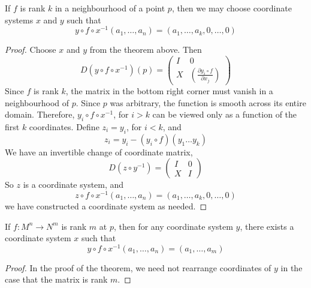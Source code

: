 \begin{corollary}
    If $f$ is rank $k$ in a neighbourhood of a point $p$, then we may choose coordinate systems $x$ and $y$ such that
    \[ y \circ f \circ x^{-1}(a_1, \dots, a_n) = (a_1, \dots, a_k, 0, \dots, 0) \]
\end{corollary}
\begin{proof}
    Choose $x$ and $y$ from the theorem above. Then
    \[ D(y \circ f \circ x^{-1})(p) = \begin{pmatrix} I & 0 \\ X & \left( \frac{\partial y_i \circ f}{\partial x_j} \right) \end{pmatrix} \]
    Since $f$ is rank $k$, the matrix in the bottom right corner must vanish in a neighbourhood of $p$. Since $p$ was arbitrary, the function is smooth across its entire domain. Therefore, $y_i \circ f \circ x^{-1}$, for $i > k$ can be viewed only as a function of the first $k$ coordinates. Define $z_i = y_i$, for $i < k$, and
    \[ z_i = y_i - (y_i \circ f)(y_1 \dots y_k) \]
    We have an invertible change of coordinate matrix,
    \[ D(z \circ y^{-1}) = \begin{pmatrix} I & 0 \\ X & I \end{pmatrix} \]
    So $z$ is a coordinate system, and
    \[ z \circ f \circ x^{-1}(a_1, \dots, a_n) = (a_1, \dots, a_k, 0, \dots, 0) \]
    we have constructed a coordinate system as needed.
\end{proof}

\begin{corollary}
    If $f: M^n \to N^m$ is rank $m$ at $p$, then for any coordinate system $y$, there exists a coordinate system $x$ such that
    \[ y \circ f \circ x^{-1} (a_1, \dots, a_n) = (a_1, \dots, a_m) \]
\end{corollary}
\begin{proof}
    In the proof of the theorem, we need not rearrange coordinates of $y$ in the case that the matrix is rank $m$.
\end{proof}

